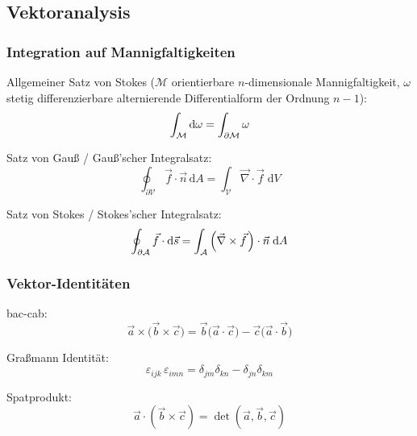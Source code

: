 	\subsection{Vektoranalysis}
		\subsubsection{Integration auf Mannigfaltigkeiten}
			\noindent
			Allgemeiner Satz von Stokes ($\mathcal{M}$ orientierbare $n$-dimensionale Mannigfaltigkeit, $\omega$ stetig differenzierbare alternierende Differentialform der Ordnung $n-1$):
			\begin{equation}
				\int_\mathcal{M} \mathrm{d} \omega = \int_{\partial\mathcal{M}} \omega
			\end{equation}

			\noindent
			Satz von Gauß / Gauß'scher Integralsatz:
			\begin{equation}
				\oint_{\partial\mathcal{V}}\vec{f}\cdot\vec{n}\,\mathrm{d}A=\int_{\mathcal{V}}\vec{\nabla}\cdot\vec{f}\;\mathrm{d}V
			\end{equation}

			\noindent
			Satz von Stokes / Stokes'scher Integralsatz:
			\begin{equation}
				\oint_{\partial\mathcal{A}}\vec{f}\cdot\mathrm{d}\vec{s}=\int_{\mathcal{A}}\left(\vec{\nabla}\times\pvec{f}\right)\cdot\vec{n}\;\mathrm{d}A
			\end{equation}

		\subsubsection{Vektor-Identitäten}
			\noindent
			bac-cab:
			\begin{equation}
				\vec{a}\times\big(\vec{b}\times\vec{c}\big) = \vec{b}\big(\vec{a}\cdot\vec{c}\big) - \vec{c}\big(\vec{a}\cdot\vec{b}\big)
			\end{equation}

			\noindent
			Graßmann Identität:
			\begin{equation}
				\varepsilon_{ijk}\,\varepsilon_{imn}=\delta_{jm}\delta_{kn}-\delta_{jn}\delta_{km}
			\end{equation}

			\noindent
			Spatprodukt:
			\begin{equation}
				\vec{a}\cdot\left(\vec{b}\times\vec{c}\right) = \det\left(\vec{a},\vec{b},\vec{c}\right)
			\end{equation}

